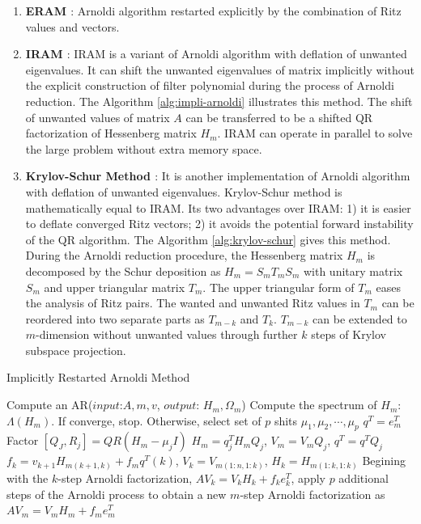 {\begin{enumerate}
	\item \textbf{ERAM \cite{morgan1996restarting}}: Arnoldi algorithm restarted explicitly by the combination of Ritz values and vectors.
	
	\item \textbf{IRAM \cite{sorensen1997implicitly}}: IRAM is a variant of Arnoldi algorithm with deflation of unwanted eigenvalues. It can shift the unwanted eigenvalues of matrix implicitly without the explicit construction of filter polynomial during the process of Arnoldi reduction. The Algorithm \ref{alg:impli-arnoldi} illustrates this method. The shift of unwanted values of matrix $A$ can be transferred to be a shifted QR factorization of Hessenberg matrix $H_m$. IRAM can operate in parallel to solve the large problem without extra memory space.
	
	\item \textbf{Krylov-Schur Method \cite{stewart2002krylov}}: It is another implementation of Arnoldi algorithm with deflation of unwanted eigenvalues. Krylov-Schur method is mathematically equal to IRAM. Its two advantages over IRAM: 1) it is easier to deflate converged Ritz vectors; 2) it avoids the potential forward instability of the QR algorithm. The Algorithm \ref{alg:krylov-schur} gives this method. During the Arnoldi reduction procedure, the Hessenberg matrix $H_m$ is decomposed by the Schur deposition as $H_m=S_mT_mS_m$ with unitary matrix $S_m$ and upper triangular matrix $T_m$. The upper triangular form of $T_m$ eases the analysis of Ritz pairs. The wanted and unwanted Ritz values in $T_m$ can be reordered into two separate parts as $T_{m-k}$ and $T_k$. $T_{m-k}$ can be extended to $m$-dimension without unwanted values through further $k$ steps of Krylov subspace projection. 
	
\end{enumerate}

\begin{algorithm}[t]{}
	\caption{Implicitly Restarted Arnoldi Method}   
	\label{alg:impli-arnoldi}   
	\begin{algorithmic}[1]
		\State Compute an AR($input$:$A,m,v$, $output$: $H_m, \Omega_m$)
		\State Compute the spectrum of $H_m$: $\Lambda (H_m)$. If converge, stop. Otherwise, select set of $p$ shits $\mu_1, \mu_2,\cdots, \mu_p$
		\State $q^T = e_m^T$
		\State Factor $[Q_J, R_j] = QR(H_m-\mu_jI)$
		\State $H_m = q_j^TH_mQ_j$, $V_m=V_mQ_j$, $q^T=q^TQ_j$
		\EndFor 
		\State $f_k=v_{k+1}H_{m(k+1,k)}+f_mq^T(k)$, $V_k=V_{m(1:n,1:k)}$, $H_k=H_{m(1:k,1:k)}$
		\State Begining with the $k$-step Arnoldi factorization, $AV_k=V_kH_k+f_ke_k^T$, apply $p$ additional steps of the Arnoldi process to obtain a new $m$-step Arnoldi factorization as $AV_m=V_mH_m+f_me_m^T$
		\EndFunction
	\end{algorithmic}  
\end{algorithm}

}
